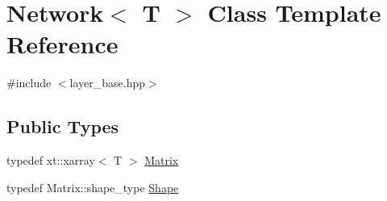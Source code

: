 \hypertarget{class_network}{}\section{Network$<$ T $>$ Class Template Reference}
\label{class_network}


{\ttfamily \#include $<$layer\+\_\+base.\+hpp$>$}

\subsection*{Public Types}
\begin{DoxyCompactItemize}
\item 
typedef xt\+::xarray$<$ T $>$ \mbox{\hyperlink{class_network_a3217727df6a4bde68fb686293258d7f6}{Matrix}}
\item 
typedef Matrix\+::shape\+\_\+type \mbox{\hyperlink{class_network_a581bef0355faccb9e6a4d4325792ec25}{Shape}}
\end{DoxyCompactItemize}
